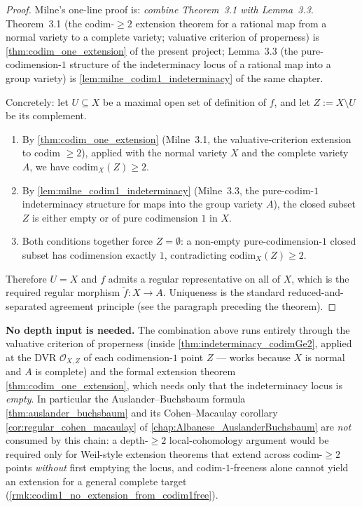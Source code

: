 \begin{proof}
  
  Milne's one-line proof is: \emph{combine Theorem~3.1 with Lemma~3.3}.
  Theorem~3.1 (the codim-\(\geq 2\) extension theorem for a rational map from a normal
  variety to a complete variety; valuative criterion of properness) is
  \cref{thm:codim_one_extension} of the present project; Lemma~3.3 (the
  pure-codimension-\(1\) structure of the indeterminacy locus of a rational map into a
  group variety) is \cref{lem:milne_codim1_indeterminacy} of the same chapter.

  Concretely: let \(U \subseteq X\) be a maximal open set of definition of \(f\), and let
  \(Z := X \setminus U\) be its complement.
  \begin{enumerate}
    \item By \cref{thm:codim_one_extension} (Milne~3.1, the valuative-criterion extension
      to codim \(\geq 2\)), applied with the normal variety \(X\) and the complete variety
      \(A\), we have \(\mathrm{codim}_X(Z) \geq 2\).
    \item By \cref{lem:milne_codim1_indeterminacy} (Milne~3.3, the pure-codim-\(1\)
      indeterminacy structure for maps into the group variety \(A\)), the closed subset
      \(Z\) is either empty or of pure codimension \(1\) in \(X\).
    \item Both conditions together force \(Z = \emptyset\): a non-empty pure-codimension-\(1\)
      closed subset has codimension exactly \(1\), contradicting \(\mathrm{codim}_X(Z) \geq 2\).
  \end{enumerate}
  Therefore \(U = X\) and \(f\) admits a regular representative on all of \(X\), which is the
  required regular morphism \(\widetilde f \colon X \to A\). Uniqueness is the standard
  reduced-and-separated agreement principle (see the paragraph preceding the theorem).
\end{proof}

\begin{remark}
  \label{rmk:thm32_role_of_ab}
  \textbf{No depth input is needed.} The combination above runs entirely through
  the valuative criterion of properness (inside
  \cref{thm:indeterminacy_codimGe2}, applied at the DVR \(\mathcal O_{X, Z}\) of
  each codimension-\(1\) point \(Z\) --- works because \(X\) is normal and \(A\) is
  complete) and the formal extension theorem \cref{thm:codim_one_extension},
  which needs only that the indeterminacy locus is \emph{empty}. In particular
  the Auslander--Buchsbaum formula \cref{thm:auslander_buchsbaum} and its
  Cohen--Macaulay corollary \cref{cor:regular_cohen_macaulay} of
  \cref{chap:Albanese_AuslanderBuchsbaum} are \emph{not} consumed by this chain:
  a depth-\(\geq 2\) local-cohomology argument would be required only for
  Weil-style extension theorems that extend across codim-\(\geq 2\) points
  \emph{without} first emptying the locus, and codim-\(1\)-freeness alone cannot
  yield an extension for a general complete target
  (\cref{rmk:codim1_no_extension_from_codim1free}).
\end{remark}

